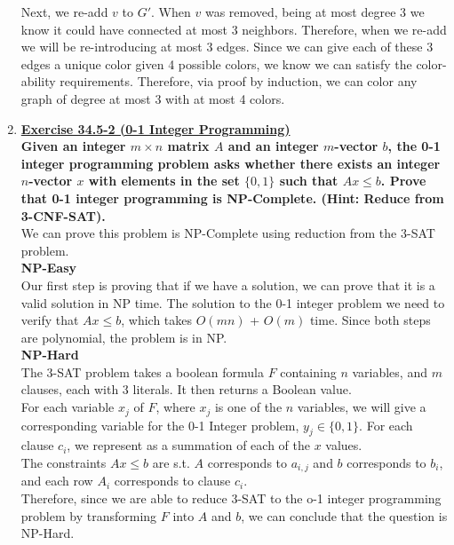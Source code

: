 \documentclass{article}
\begin{document}
\begin{enumerate}
Next, we re-add $v$ to $G'$. When $v$ was removed, being at most degree 3 we know it could have connected at most 3 neighbors. Therefore, when we re-add we will be re-introducing at most 3 edges. Since we can give each of these 3 edges a unique color given 4 possible colors, we know we can satisfy the color-ability requirements. Therefore, via proof by induction, we can color any graph of degree at most 3 with at most 4 colors. 







\newpage
\item \textbf{ \underline{Exercise 34.5-2 (0-1 Integer Programming)} } \\
\textbf{Given an integer $m \times n$ matrix $A$ and an integer $m$-vector $b$, the 0-1 integer programming problem asks whether there exists an integer $n$-vector $x$ with elements in the set $\{0,1\}$ such that $Ax \leq b$. Prove that 0-1 integer programming is NP-Complete. (Hint: Reduce from 3-CNF-SAT). } \\

We can prove this problem is NP-Complete using reduction from the 3-SAT problem. \\

\textbf{NP-Easy} \\
Our first step is proving that if we have a solution, we can prove that it is a valid solution in NP time. The solution to the 0-1 integer problem we need to verify that $Ax \leq b$, which takes $O(mn)$ + $O(m)$ time. Since both steps are polynomial, the problem is in NP. \\

\textbf{NP-Hard} \\
The 3-SAT problem takes a boolean formula $F$ containing $n$ variables, and $m$ clauses, each with 3 literals. It then returns a Boolean value. \\

For each variable $x_j$ of $F$, where $x_j$ is one of the $n$ variables, we will give a corresponding variable for the 0-1 Integer problem, $y_j \in \{ 0,1 \}$. For each clause $c_i$, we represent as a summation of each of the $x$ values. \\

The constraints $Ax \leq b$ are s.t. $A$ corresponds to $a_{i,j}$ and $b$ corresponds to $b_i$, and each row $A_i$ corresponds to clause $c_i$. \\

Therefore, since we are able to reduce 3-SAT to the o-1 integer programming problem by transforming $F$ into $A$ and $b$, we can conclude that the question is NP-Hard. \\


\end{enumerate}
\end{document}
